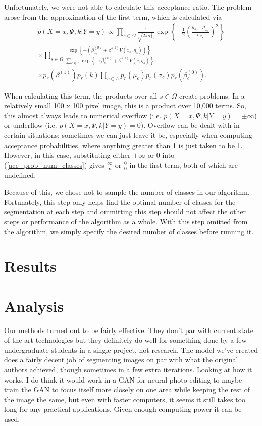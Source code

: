 \documentclass[11pt]{article}
\begin{document}
Unfortunately, we were not able to calculate this acceptance ratio.
The problem arose from the approximation of the first term, which is calculated via
\begin{equation}
\begin{aligned}
   p(X=x, \Psi, k | Y = y) \propto \prod_{s \in \Omega}  \frac{1}{\sqrt{2 \pi \sigma_{x_s}^2}} \exp \left \{ -\frac{1}{2} \left( \frac{y_s - \mu_{x_s} }{ \sigma_{x_s}}\right)^2  \right \} \\
   \times \prod_{s \in \Omega} \frac{\exp \left \{ - \left(\beta_{x_s}^{(0)} + \beta^{(1)} V(x_s, \eta_s) \right)  \right \} }{\sum_{c \in \Lambda} \exp \left \{ -(\beta^{(0)}_c + \beta^{(1)} V(c, \eta_s)  \right \}} \\
   \times p_r\left(\beta^{(1)}\right) p_r(k) \prod_{c \in \Lambda} p_r (\mu_c) p_r ( \sigma_c ) p_r (\beta_c^{(0)}).
\end{aligned}
\end{equation}

When calculating this term, the products over all $ s \in \Omega $ create problems.
In a relatively small 100 x 100 pixel image, this is a product over 10,000 terms.
So, this almost always leads to numerical overflow (i.e. $p(X=x, \Psi, k | Y = y) = \pm \infty $) or underflow (i.e. $ p(X=x, \Psi, k | Y = y) = 0$).
Overflow can be dealt with in certain situations; sometimes we can just leave it be, especially when computing acceptance probabilities, where anything greater than 1 is just taken to be 1.
However, in this case, substituting either $\pm\infty$ or $ 0 $ into (\ref{acc_prob_num_classes}) gives $ \frac{\infty}{\infty} $ or $ \frac{0}{0} $ in the first term, both of which are undefined.

Because of this, we chose not to sample the number of classes in our algorithm.
Fortunately, this step only helps find the optimal number of classes for the segmentation at each step and ommitting this step should not affect the other steps or performance of the algorithm as a whole.
With this step omitted from the algorithm, we simply specify the desired number of classes before running it.

\section{Results}


\section{Analysis}
Our methods turned out to be fairly effective. They don’t par with current state of the art technologies but they definitely do well for something done by a few undergraduate students in a single project, not research. The model we’ve created does a fairly decent job of segmenting images on par with what the original authors achieved, though sometimes in a few extra iterations. Looking at how it works, I do think it would work in a GAN for neural photo editing to maybe train the GAN to focus itself more closely on one area while keeping the rest of the image the same, but even with faster computers, it seems it still takes too long for any practical applications. Given enough computing power it can be used.
\end{document}
